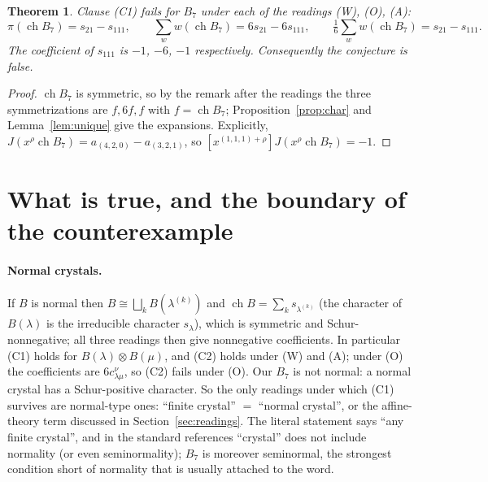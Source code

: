 \documentclass[11pt]{article}
\newtheorem{theorem}{Theorem}
\theoremstyle{definition}
\theoremstyle{remark}
\newcommand{\ch}{\operatorname{ch}}
\begin{document}
\begin{theorem}\label{thm:main}
Clause (C1) fails for $B_7$ under each of the readings (W), (O), (A):
\[
\pi(\ch B_7)=s_{21}-s_{111},\qquad \sum_{w}w(\ch B_7)=6s_{21}-6s_{111},\qquad
\tfrac16\sum_w w(\ch B_7)=s_{21}-s_{111}.
\]
The coefficient of $s_{111}$ is $-1$, $-6$, $-1$ respectively. Consequently the conjecture is
false.
\end{theorem}
\begin{proof}
$\ch B_7$ is symmetric, so by the remark after the readings the three symmetrizations are
$f,6f,f$ with $f=\ch B_7$; Proposition~\ref{prop:char} and Lemma~\ref{lem:unique} give the
expansions. Explicitly, $J(x^\rho\ch B_7)=a_{(4,2,0)}-a_{(3,2,1)}$, so
$[x^{(1,1,1)+\rho}]J(x^\rho\ch B_7)=-1$.
\end{proof}

\section{What is true, and the boundary of the counterexample}

\paragraph{Normal crystals.} If $B$ is normal then $B\cong\bigsqcup_k B(\lambda^{(k)})$ and
$\ch B=\sum_k s_{\lambda^{(k)}}$ (the character of $B(\lambda)$ is the irreducible character
$s_\lambda$), which is symmetric and Schur-nonnegative; all three readings then give
nonnegative coefficients. In particular (C1) holds for $B(\lambda)\otimes B(\mu)$, and (C2) holds
under (W) and (A); under (O) the coefficients are $6c^\nu_{\lambda\mu}$, so (C2) fails under (O).
Our $B_7$ is not normal: a normal crystal has a Schur-positive character. So the only readings
under which (C1) survives are normal-type ones: ``finite crystal'' $=$ ``normal crystal'', or the
affine-theory term discussed in Section~\ref{sec:readings}. The literal statement
says ``any finite crystal'', and in the standard references \cite{Kas93,Kas95,BS17}
``crystal'' does not include normality (or even seminormality); $B_7$ is moreover seminormal,
the strongest condition short of normality that is usually attached to the word.
\end{document}
